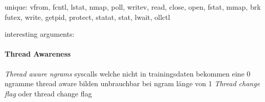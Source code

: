                 unique:
                    vfrom, fcntl, lstat, nmap, poll, writev, read, close, open, fstat, mmap, brk
                    futex, write, getpid, protect, statat, stat, lwait, ollctl

            interesting arguments:
            
            \paragraph{Thread Awareness}
                \textit{Thread aware ngrams}
                    syscalls welche nicht in trainingsdaten bekommen eine 0
                    ngramme thread aware bilden unbrauchbar bei ngram länge von 1
                \textit{Thread change flag}
                    oder thread change flag

